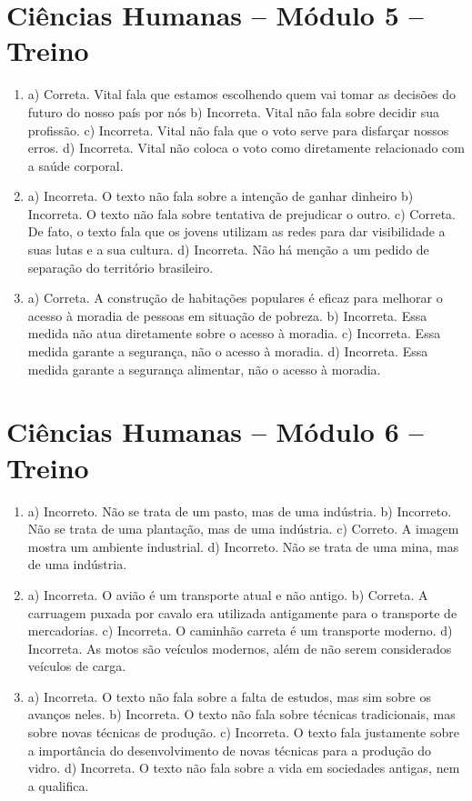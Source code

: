 \section*{Ciências Humanas – Módulo 5 – Treino}

\begin{enumerate}
\item
a) Correta. Vital fala que estamos escolhendo quem vai tomar as decisões
do futuro do nosso país por nós
b) Incorreta. Vital não fala sobre decidir sua profissão.
c) Incorreta. Vital não fala que o voto serve para disfarçar nossos
erros.
d) Incorreta. Vital não coloca o voto como diretamente relacionado com a
saúde corporal.

\item
a) Incorreta. O texto não fala sobre a intenção de ganhar dinheiro
b) Incorreta. O texto não fala sobre tentativa de prejudicar o outro.
c) Correta. De fato, o texto fala que os jovens utilizam as redes para
dar visibilidade a suas lutas e a sua cultura.
d) Incorreta. Não há menção a um pedido de separação do território
brasileiro.

\item
a) Correta. A construção de habitações populares é eficaz para melhorar
o acesso à moradia de pessoas em situação de pobreza.
b) Incorreta. Essa medida não atua diretamente sobre o acesso à moradia.
c) Incorreta. Essa medida garante a segurança, não o acesso à moradia.
d) Incorreta. Essa medida garante a segurança alimentar, não o acesso
à moradia.
\end{enumerate}

\section*{Ciências Humanas – Módulo 6 – Treino}

\begin{enumerate}
\item
a) Incorreto. Não se trata de um pasto, mas de uma indústria.
b) Incorreto. Não se trata de uma plantação, mas de uma indústria.
c) Correto. A imagem mostra um ambiente industrial.
d) Incorreto. Não se trata de uma mina, mas de uma indústria.

\item
a) Incorreta. O avião é um transporte atual e não antigo.
b) Correta. A carruagem puxada por cavalo era utilizada antigamente para o
transporte de mercadorias.
c) Incorreta. O caminhão carreta é um transporte moderno.
d) Incorreta. As motos são veículos modernos, além de não serem considerados veículos de carga.

\item
a) Incorreta. O texto não fala sobre a falta de estudos, mas sim sobre
os avanços neles.
b) Incorreta. O texto não fala sobre técnicas tradicionais, mas sobre
novas técnicas de produção.
c) Incorreta. O texto fala justamente sobre a importância do
desenvolvimento de novas técnicas para a produção do vidro.
d) Incorreta. O texto não fala sobre a vida em sociedades antigas, nem a
qualifica.
\end{enumerate}

